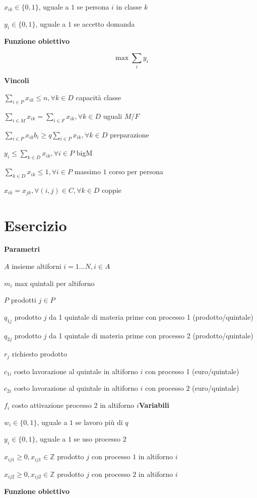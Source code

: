 \documentclass[10pt,a4paper,twoside,openright]{book}
\newcounter{es}
\newcommand{\Es}{
	\stepcounter{es}
	\section{Esercizio \arabic{es}}
	}
\newcommand{\Par}{\textbf{Parametri}}
\newcommand{\Var}{\textbf{Variabili}}
\newcommand{\Fob}{\textbf{Funzione obiettivo}}
\newcommand{\Vin}{\textbf{Vincoli}}
\begin{document}
$x_{ik} \in \{0,1\}$, uguale a $1$ se persona $i$ in classe $k$

$y_{i} \in \{0,1\}$, uguale a $1$ se accetto domanda

\Fob

\begin{equation*}
	\max\sum _{i} y_{i}
\end{equation*}

\Vin

$\sum _{i\in P} x_{ik} \leq n,\forall k\in D$ capacità classe

$\sum _{i\in M} x_{ik} =\sum _{i\in F} x_{ik} ,\forall k\in D$ uguali $M/F$

$\sum _{i\in P} x_{ik} b_{i} \geqslant q\sum _{i\in P} x_{ik} ,\forall k\in D$ preparazione

$y_{i} \leq \sum _{k\in D} x_{ik} ,\forall i\in P$ bigM

$\sum _{k\in D} x_{ik} \leq 1,\forall i\in P$ massimo $1$ corso per persona

$x_{ik} =x_{jk} ,\forall (i,j)\in C,\forall k\in D$ coppie

\Es

\Par

$A$ insieme altiforni $i=1\dotsc N,i\in A$

$m_{i}$ max quintali per altiforno

$P$ prodotti $j\in P$

$q_{1j}$ prodotto $j$ da 1 quintale di materia prime con processo 1 (prodotto/quintale)

$q_{2j}$ prodotto $j$ da 1 quintale di materia prime con processo 2 (prodotto/quintale)

$r_{j}$ richiesto prodotto

$c_{1i}$ costo lavorazione al quintale in altiforno $i$ con processo 1 (euro/quintale)

$c_{2i}$ costo lavorazione al quintale in altiforno $i$ con processo $2$ (euro/quintale)

$f_{i}$ costo attivazione processo 2 in altiforno $i$\Var

$w_{i} \in \{0,1\}$, uguale a $1$ se lavoro più di $q$

$y_{i} \in \{0,1\}$, uguale a $1$ se uso processo $2$

$x_{ij1} \geqslant 0,x_{ij1} \in \mathbb{Z}$ prodotto $j$ con processo $1$ in altiforno $i$

$x_{ij2} \geqslant 0,x_{ij2} \in \mathbb{Z}$ prodotto $j$ con processo $2$ in altiforno $i$

\Fob
\end{document}
